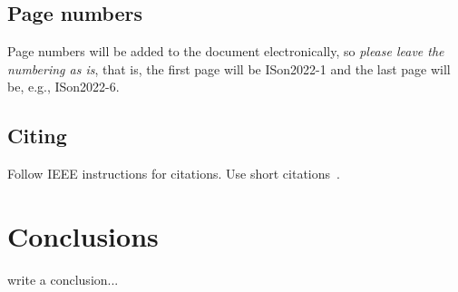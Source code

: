 \documentclass{article}
\begin{document}
\subsection{Page numbers}
Page numbers will be added to the document electronically, so
{\em please leave the numbering as is}, that is, the first page will be
ISon2022-1 and the last page will be, e.g., ISon2022-6.

\subsection{Citing}
Follow IEEE instructions for citations. Use short citations~\cite{icad1,ison1}.
%
\section{Conclusions}
write a conclusion...



\end{document}
